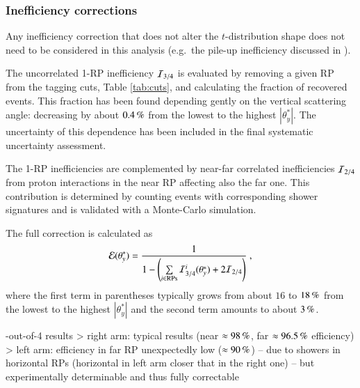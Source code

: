 \subsubsection{Inefficiency corrections}
\label{sec:ineff corr}

Any inefficiency correction that does not alter the $t$-distribution shape does not need to be considered in this analysis (e.g.~the pile-up inefficiency discussed in \cite{prl111}).

The uncorrelated 1-RP inefficiency ${\cal I}_{3/4}$ is evaluated by removing a given RP from the tagging cuts, Table \ref{tab:cuts}, and calculating the fraction of recovered events. This fraction has been found depending gently on the vertical scattering angle: decreasing by about $0.4\,{\rm \%}$ from the lowest to the highest $|\theta_y^*|$. The uncertainty of this dependence has been included in the final systematic uncertainty assessment.

The 1-RP inefficiencies are complemented by near-far correlated inefficiencies ${\cal I}_{2/4}$ from proton interactions in the near RP affecting also the far one. This contribution is determined by counting events with corresponding shower signatures and is validated with a Monte-Carlo simulation.

The full correction is calculated as
\begin{equation}
\label{efficiency}
	{\cal E}(\theta_y^*) = {1\over 1 - \left( \sum\limits_{i\in \rm RPs} {\cal I}^i_{3/4}(\theta_y^*) + 2 {\cal I}_{2/4} \right) } \ ,
\end{equation}
where the first term in parentheses typically grows from about $16$ to $18\,{\rm \%}$ from the lowest to the highest $|\theta_y^*|$ and the second term amounts to about $3\,{\rm \%}$.

\iffalse
{}-out-of-4 results
\>> right arm: typical results (near $\approx 98\,{\rm \%}$, far $\approx 96.5\,{\rm \%}$ efficiency)
\>> left arm: efficiency in far RP unexpectedly low ($\approx 90\,{\rm \%}$) -- due to showers in horizontal RPs (horizontal in left arm closer that in the right one) -- but experimentally determinable and thus fully correctable

